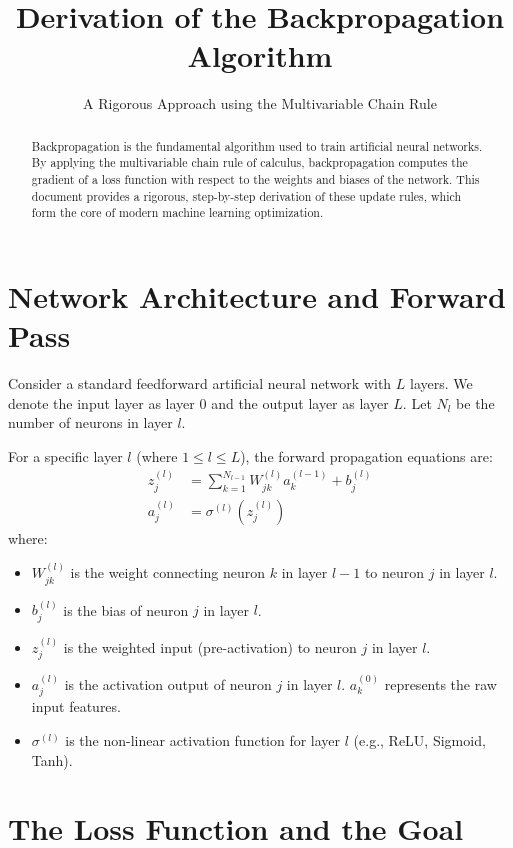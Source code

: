 \documentclass[11pt, a4paper]{article}
\title{\vspace{-2cm}\textbf{Derivation of the Backpropagation Algorithm}}
\author{A Rigorous Approach using the Multivariable Chain Rule}
\date{}
\begin{document}
\maketitle

\begin{abstract}
Backpropagation is the fundamental algorithm used to train artificial neural networks. By applying the multivariable chain rule of calculus, backpropagation computes the gradient of a loss function with respect to the weights and biases of the network. This document provides a rigorous, step-by-step derivation of these update rules, which form the core of modern machine learning optimization.
\end{abstract}

\section{Network Architecture and Forward Pass}

Consider a standard feedforward artificial neural network with $L$ layers. We denote the input layer as layer $0$ and the output layer as layer $L$. Let $N_l$ be the number of neurons in layer $l$.

For a specific layer $l$ (where $1 \le l \le L$), the forward propagation equations are:
\begin{align}
    z_j^{(l)} &= \sum_{k=1}^{N_{l-1}} W_{jk}^{(l)} a_k^{(l-1)} + b_j^{(l)} \\
    a_j^{(l)} &= \sigma^{(l)}\left( z_j^{(l)} \right)
\end{align}
where:
\begin{itemize}
    \item $W_{jk}^{(l)}$ is the weight connecting neuron $k$ in layer $l-1$ to neuron $j$ in layer $l$.
    \item $b_j^{(l)}$ is the bias of neuron $j$ in layer $l$.
    \item $z_j^{(l)}$ is the weighted input (pre-activation) to neuron $j$ in layer $l$.
    \item $a_j^{(l)}$ is the activation output of neuron $j$ in layer $l$. $a_k^{(0)}$ represents the raw input features.
    \item $\sigma^{(l)}$ is the non-linear activation function for layer $l$ (e.g., ReLU, Sigmoid, Tanh).
\end{itemize}

\section{The Loss Function and the Goal}
\end{document}

